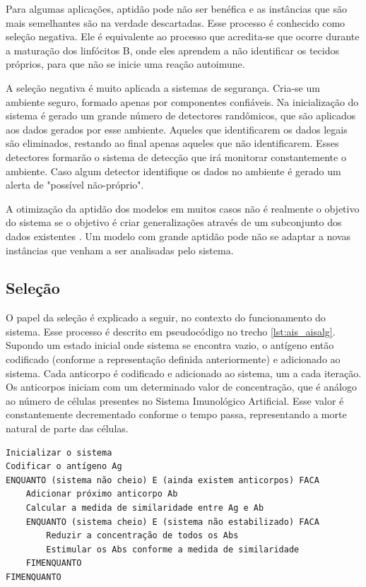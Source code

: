 Para algumas aplicações, aptidão pode não ser benéfica e as instâncias que são mais semelhantes são na verdade descartadas. Esse processo é conhecido como seleção negativa. Ele é equivalente ao processo que acredita-se que ocorre durante a maturação dos linfócitos B, onde eles aprendem a não identificar os tecidos próprios, para que não se inicie uma reação autoimune.

A seleção negativa é muito aplicada a sistemas de segurança. Cria-se um ambiente seguro, formado apenas por componentes confiáveis. Na inicialização do sistema é gerado um grande número de detectores randômicos, que são aplicados aos dados gerados por esse ambiente. Aqueles que identificarem os dados legais são eliminados, restando ao final apenas aqueles que não identificarem. Esses detectores formarão o sistema de detecção que irá monitorar constantemente o ambiente. Caso algum detector identifique os dados no ambiente é gerado um alerta de "possível não-próprio".

A otimização da aptidão dos modelos em muitos casos não é realmente o objetivo do sistema se o objetivo é criar generalizações através de um subconjunto dos dados existentes \cite{Hand2001}. Um modelo com grande aptidão pode não se adaptar a novas instâncias que venham a ser analisadas pelo sistema.

\subsection{Seleção}

O papel da seleção é explicado a seguir, no contexto do funcionamento do sistema. Esse processo é descrito em pseudocódigo no trecho \ref{lst:ais_aisalg}. Supondo um estado inicial onde sistema se encontra vazio, o antígeno então codificado (conforme a representação definida anteriormente) e adicionado ao sistema. Cada anticorpo é codificado e adicionado ao sistema, um a cada iteração. Os anticorpos iniciam com um determinado valor de concentração, que é análogo ao número de células presentes no Sistema Imunológico Artificial. Esse valor é constantemente decrementado conforme o tempo passa, representando a morte natural de parte das células.

\vspace{1cm}
\begin{lstlisting}[caption=Pseudo código de um Sistema Imunológico Artificial \cite{Aickelin2005},label=lst:ais_aisalg]
Inicializar o sistema
Codificar o antígeno Ag
ENQUANTO (sistema não cheio) E (ainda existem anticorpos) FACA
    Adicionar próximo anticorpo Ab
    Calcular a medida de similaridade entre Ag e Ab
    ENQUANTO (sistema cheio) E (sistema não estabilizado) FACA
        Reduzir a concentração de todos os Abs
        Estimular os Abs conforme a medida de similaridade
    FIMENQUANTO
FIMENQUANTO
\end{lstlisting}

